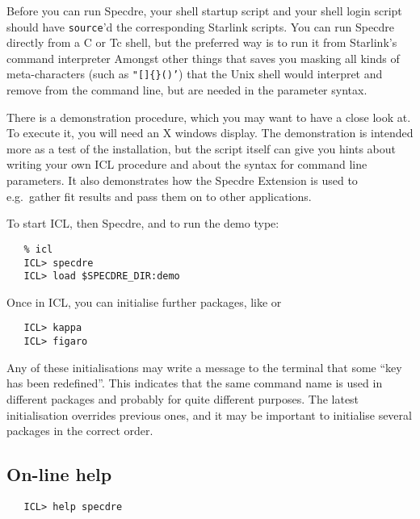    Before you can run Specdre, your shell startup script and your shell
   login script should have {\tt source}'d the corresponding Starlink
   scripts. You can run Specdre directly from a C or Tc shell, but the
   preferred way is to run it from Starlink's command interpreter
   Amongst other things that saves you masking all kinds of
   meta-characters (such as {\tt "[]\{\}()'}) that the Unix shell would
   interpret and remove from the command line, but are needed in the
   parameter syntax.

   There is a demonstration procedure, which you may want to have a
   close look at. To execute it, you will need an X windows display. The
   demonstration is intended more as a test of the installation, but the
   script itself can give you hints about writing your own ICL
   procedure and about the syntax for command line parameters. It also
   demonstrates how the Specdre Extension is used to e.g.\ gather fit
   results and pass them on to other applications.

   To start ICL, then Specdre, and to run the demo type:

\begin{verbatim}
   % icl
   ICL> specdre
   ICL> load $SPECDRE_DIR:demo
\end{verbatim}

   Once in ICL, you can initialise further packages, like
   or

\begin{verbatim}
   ICL> kappa
   ICL> figaro
\end{verbatim}

   Any of these initialisations may write a message to the terminal that
   some ``key has been redefined''. This indicates that the same command
   name is used in different packages and probably for quite different
   purposes. The latest initialisation overrides previous ones, and it
   may be important to initialise several packages in the correct order.


\subsection{On-line help}

\begin{verbatim}
   ICL> help specdre
\end{verbatim}

